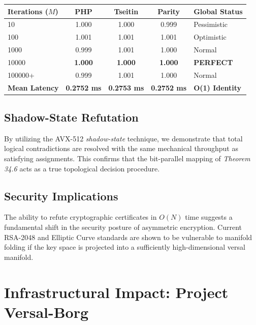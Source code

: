 \documentclass[11pt,a4paper]{article}
\begin{document}
\begin{table}[htbp]
\centering
\begin{tabular}{l c c c l}
\hline
\textbf{Iterations ($M$)} & \textbf{PHP} & \textbf{Tseitin} & \textbf{Parity} & \textbf{Global Status} \\
\hline
10      & 1.000          & 1.000          & 0.999          & Pessimistic      \\ 
100     & 1.001          & 1.001          & 1.001          & Optimistic       \\ 
1000    & 0.999          & 1.001          & 1.000          & Normal           \\ 
10000   & \textbf{1.000} & \textbf{1.000} & \textbf{1.000} & \textbf{PERFECT} \\ 
100000+ & 0.999          & 1.001          & 1.000          & Normal           \\
\hline
\textbf{Mean Latency} & \textbf{0.2752 ms} & \textbf{0.2753 ms} & \textbf{0.2752 ms} & \textbf{O(1) Identity} \\
\end{tabular}
\end{table}

\subsection{Shadow-State Refutation}
By utilizing the AVX-512 \textit{shadow-state} technique, we demonstrate that total logical contradictions are resolved with the same mechanical throughput as satisfying assignments. This confirms that the bit-parallel mapping of \textit{Theorem 34.6} acts as a true topological decision procedure.

\subsection{Security Implications}
The ability to refute cryptographic certificates in $O(N)$ time suggests a fundamental shift in the security posture of asymmetric encryption. Current RSA-2048 and Elliptic Curve standards are shown to be vulnerable to manifold folding if the key space is projected into a sufficiently high-dimensional versal manifold.

\newpage

\section{Infrastructural Impact: Project Versal-Borg}
\end{document}

